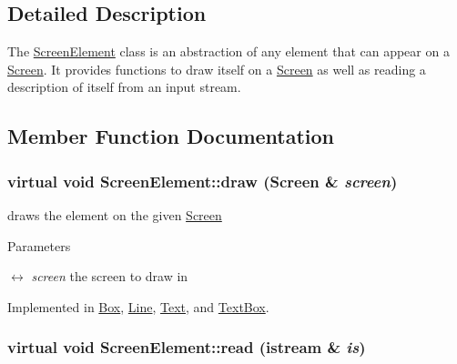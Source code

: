\subsection{Detailed Description}
The \hyperlink{classScreenElement}{ScreenElement} class is an abstraction of any element that can appear on a \hyperlink{classScreen}{Screen}. It provides functions to draw itself on a \hyperlink{classScreen}{Screen} as well as reading a description of itself from an input stream. 

\subsection{Member Function Documentation}
\hypertarget{classScreenElement_a1bf719edc836cc6ceaa84014c7342028}{
\subsubsection[{draw}]{\setlength{\rightskip}{0pt plus 5cm}virtual void ScreenElement::draw ({\bf Screen} \& {\em screen})}}
\label{classScreenElement_a1bf719edc836cc6ceaa84014c7342028}


draws the element on the given \hyperlink{classScreen}{Screen} 
\begin{DoxyParams}{Parameters}
\item[\mbox{$\leftrightarrow$} {\em screen}]the screen to draw in \end{DoxyParams}


Implemented in \hyperlink{classBox_a5c6c1c650b13f2978e3b559bb5af15d2}{Box}, \hyperlink{classLine_a0f119b83f7c23a1bf27b6d34f93b63f2}{Line}, \hyperlink{classText_a5fedb2f5b4c40b9cd8965d58716b73f8}{Text}, and \hyperlink{classTextBox_ae28a00e6cd50d5432c02b579b0fb32ed}{TextBox}.\hypertarget{classScreenElement_ae5c8356d0faace202bb3ee620433677e}{
\subsubsection[{read}]{\setlength{\rightskip}{0pt plus 5cm}virtual void ScreenElement::read (istream \& {\em is})}}
\label{classScreenElement_ae5c8356d0faace202bb3ee620433677e}


